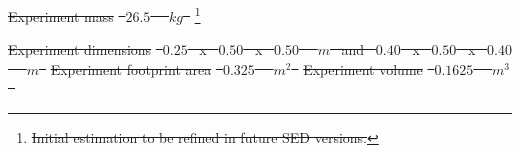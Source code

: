 \documentclass[a4paper,12pt,twoside, final]{article}
\providecommand{\DIFdeltex}[1]{{\protect\color{red}\sout{#1}}}                      %
\providecommand{\DIFdelbegin}{} %
\providecommand{\DIFdelFL}[1]{\DIFdel{#1}} %
\providecommand{\DIFdel}[1]{\texorpdfstring{\DIFdeltex{#1}}{}} %
\newcommand{\DIFscaledelfig}{0.5}
\newlength{\DIFdelgraphicswidth} %
\newlength{\DIFdelgraphicsheight} %
\newcommand{\DIFdelincludegraphics}[2][]{%
\sbox{\DIFdelgraphicsbox}{\DIFOincludegraphics[#1]{#2}}%
\settoboxwidth{\DIFdelgraphicswidth}{\DIFdelgraphicsbox} %
\settoboxtotalheight{\DIFdelgraphicsheight}{\DIFdelgraphicsbox} %
\scalebox{\DIFscaledelfig}{%
\parbox[b]{\DIFdelgraphicswidth}{\usebox{\DIFdelgraphicsbox}\\[-\baselineskip] \rule{\DIFdelgraphicswidth}{0em}}\llap{\resizebox{\DIFdelgraphicswidth}{\DIFdelgraphicsheight}{%
\setlength{\unitlength}{\DIFdelgraphicswidth}%
\begin{picture}(1,1)%
\thicklines\linethickness{2pt} %
{\color[rgb]{1,0,0}\put(0,0){\framebox(1,1){}}}%
{\color[rgb]{1,0,0}\put(0,0){\line( 1,1){1}}}%
{\color[rgb]{1,0,0}\put(0,1){\line(1,-1){1}}}%
\end{picture}%
}\hspace*{3pt}}} %
} %
\DeclareRobustCommand{\DIFdelbegin}{\DIFOdelbegin \let\includegraphics\DIFdelincludegraphics} %
\begin{document}
\DIFdelbegin %
\DIFdelFL{Experiment mass  }%
\DIFdelFL{\mbox{%
$26.5$
}%
\mbox{%
$kg$
}%
}\footnote[13]{\DIFdelFL{Initial estimation to be refined in future SED versions.}} %
\addtocounter{footnote}{-1}%
\DIFdelFL{Experiment dimensions }%
\DIFdelFL{\mbox{%
$0.25$
}%
x \mbox{%
$0.50$
}%
x \mbox{%
$0.50$
}%
\mbox{%
$m$
}%
and \mbox{%
$0.40$
}%
x \mbox{%
$0.50$
}%
x \mbox{%
$0.40$
}%
\mbox{%
$m$
}%
}%
\DIFdelFL{Experiment footprint area }%
\DIFdelFL{\mbox{%
$0.325$
}%
\mbox{%
$m^2$
}%
}%
\DIFdelFL{Experiment volume  }%
\DIFdelFL{\mbox{%
$0.1625$
}%
\mbox{%
$m^3$
}%
}%
\end{document}
